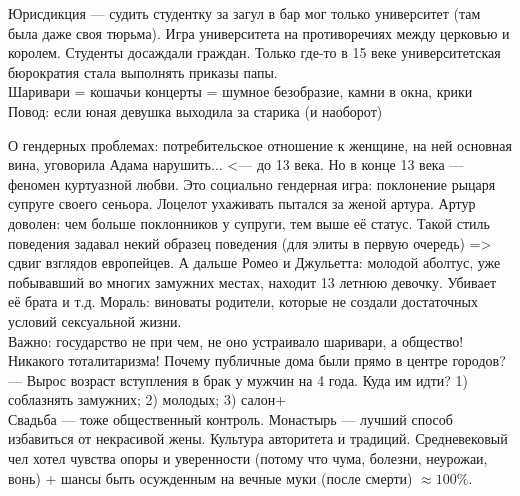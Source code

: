 \documentclass[a4paper,12pt]{article}
\begin{document}
Юрисдикция --- судить студентку за загул в бар мог только университет (там была даже своя тюрьма). Игра университета на противоречиях между церковью и королем. Студенты досаждали граждан. Только где-то в 15 веке университетская бюрократия стала выполнять приказы папы.\\
Шаривари = кошачьи концерты = шумное безобразие, камни в окна, крики\\
Повод: если юная девушка выходила за старика (и наоборот)

О гендерных проблемах: потребительское отношение к женщине, на ней основная вина, уговорила Адама нарушить... <--- до 13 века. Но в конце 13 века --- феномен куртуазной любви. Это социально гендерная игра: поклонение рыцаря супруге своего сеньора. Лоцелот ухаживать пытался за женой артура. Артур доволен: чем больше поклонников у супруги, тем выше её статус. Такой стиль поведения задавал некий образец поведения (для элиты в первую очередь) => сдвиг взглядов европейцев. А дальше Ромео и Джульетта: молодой аболтус, уже побывавший во многих замужних местах, находит 13 летнюю девочку. Убивает её брата и т.д. Мораль: виноваты родители, которые не создали достаточных условий сексуальной жизни. \\
Важно: государство не при чем, не оно устраивало шаривари, а общество! Никакого тоталитаризма! Почему публичные дома были прямо в центре городов? --- Вырос возраст вступления в брак у мужчин на 4 года. Куда им идти? 1) соблазнять замужних; 2) молодых; 3) салон+\\
Свадьба --- тоже общественный контроль. Монастырь --- лучший способ избавиться от некрасивой жены. Культура авторитета и традиций. Средневековый чел хотел чувства опоры и уверенности (потому что чума, болезни, неурожаи, вонь) + шансы быть осужденным на вечные муки (после смерти) $\approx 100\%$. 
\end{document}
